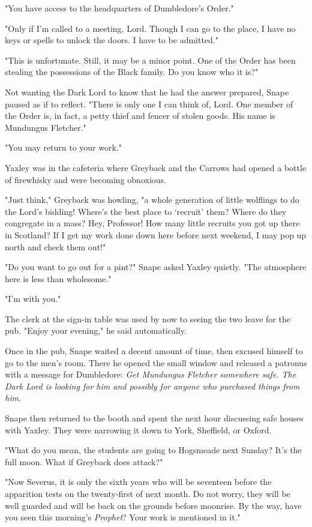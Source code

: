 "You have access to the headquarters of Dumbledore's Order."

"Only if I'm called to a meeting, Lord. Though I can go to the place, I have no keys or spells to unlock the doors. I have to be admitted."

"This is unfortunate. Still, it may be a minor point. One of the Order has been stealing the possessions of the Black family. Do you know who it is?"

Not wanting the Dark Lord to know that he had the answer prepared, Snape paused as if to reflect. "There is only one I can think of, Lord. One member of the Order is, in fact, a petty thief and fencer of stolen goods. His name is Mundungus Fletcher."

"You may return to your work."

Yaxley was in the cafeteria where Greyback and the Carrows had opened a bottle of firewhisky and were becoming obnoxious.

"Just think," Greyback was howling, "a whole generation of little wolflings to do the Lord's bidding! Where's the best place to `recruit' them? Where do they congregate in a mass? Hey, Professor! How many little recruits you got up there in Scotland? If I get my work done down here before next weekend, I may pop up north and check them out!"

"Do you want to go out for a pint?" Snape asked Yaxley quietly. "The atmosphere here is less than wholesome."

"I'm with you."

The clerk at the sign-in table was used by now to seeing the two leave for the pub. "Enjoy your evening," he said automatically.

Once in the pub, Snape waited a decent amount of time, then excused himself to go to the men's room. There he opened the small window and released a patronus with a message for Dumbledore: \emph{Get Mundungus Fletcher somewhere safe. The Dark Lord is looking for him and possibly for anyone who purchased things from him.}

Snape then returned to the booth and spent the next hour discussing safe houses with Yaxley. They were narrowing it down to York, Sheffield, or Oxford.

\sbreak

"What do you mean, the students are going to Hogsmeade next Sunday? It's the full moon. What if Greyback does attack?"

"Now Severus, it is only the sixth years who will be seventeen before the apparition tests on the twenty-first of next month. Do not worry, they will be well guarded and will be back on the grounds before moonrise. By the way, have you seen this morning's \emph{Prophet}? Your work is mentioned in it."

